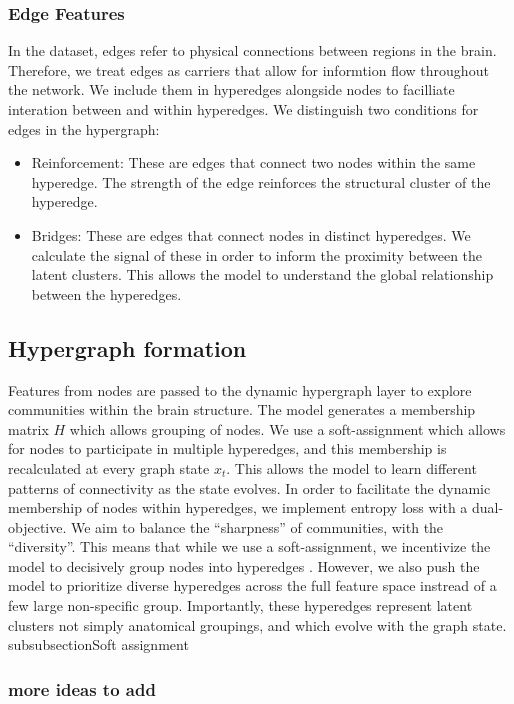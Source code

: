 \documentclass[sigconf, review]{acmart}
\begin{document}
\subsubsection{Edge Features}
In the dataset, edges refer to physical connections between regions in the brain. Therefore, we treat edges as carriers that allow for informtion flow throughout the network. We include them in hyperedges alongside nodes to facilliate interation between and within hyperedges. We distinguish two conditions for edges in the hypergraph:
\begin{itemize}
    \item Reinforcement: These are edges that connect two nodes within the same hyperedge. The strength of the edge reinforces the structural cluster of the hyperedge.
    \item Bridges: These are edges that connect nodes in distinct hyperedges. We calculate the signal of these in order to inform the proximity between the latent clusters. This allows the model to understand the global relationship between the hyperedges.
\end{itemize}

\subsection{Hypergraph formation}

Features from nodes are passed to the dynamic hypergraph layer to explore communities within the brain structure. The model generates a membership matrix $H$ which allows grouping of nodes. We use a soft-assignment which allows for nodes to participate in multiple hyperedges, and this membership is recalculated at every graph state $x_t$. This allows the model to learn different patterns of connectivity as the state evolves. In order to facilitate the dynamic membership of nodes within hyperedges, we implement entropy loss with a dual-objective. We aim to balance the ``sharpness'' of communities, with the ``diversity''. This means that while we use a soft-assignment, we incentivize the model to decisively group nodes into hyperedges . However, we also push the model to prioritize diverse hyperedges across the full feature space instread of a few large non-specific group. Importantly, these hyperedges represent latent clusters not simply anatomical groupings, and which evolve with the graph state.
subsubsection{Soft assignment}

\subsubsection{more ideas to add}
\end{document}
